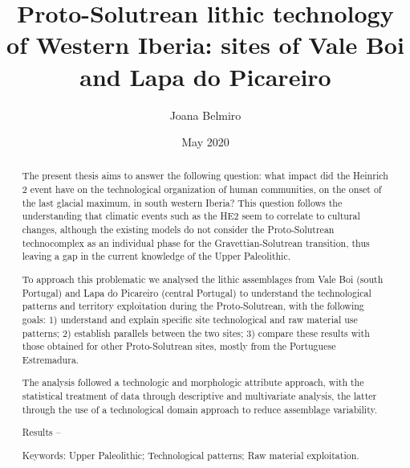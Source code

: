 \documentclass[12pt,twoside]{reedthesis}
\title{Proto-Solutrean lithic technology of Western Iberia: sites of Vale Boi and Lapa do Picareiro}
\author{Joana Belmiro}
\date{May 2020}
\begin{document}
  \maketitle

\frontmatter %
\pagestyle{empty} %


  \begin{abstract}
    The present thesis aims to answer the following question: what impact did the Heinrich 2 event have on the technological organization of human communities, on the onset of the last glacial maximum, in south western Iberia? This question follows the understanding that climatic events such as the HE2 seem to correlate to cultural changes, although the existing models do not consider the Proto-Solutrean technocomplex as an individual phase for the Gravettian-Solutrean transition, thus leaving a gap in the current knowledge of the Upper Paleolithic.
    
    \par
    
    To approach this problematic we analysed the lithic assemblages from Vale Boi (south Portugal) and Lapa do Picareiro (central Portugal) to understand the technological patterns and territory exploitation during the Proto-Solutrean, with the following goals: 1) understand and explain specific site technological and raw material use patterns; 2) establish parallels between the two sites; 3) compare these results with those obtained for other Proto-Solutrean sites, mostly from the Portuguese Estremadura.
    
    The analysis followed a technologic and morphologic attribute approach, with the statistical treatment of data through descriptive and multivariate analysis, the latter through the use of a technological domain approach to reduce assemblage variability.
    
    Results --
    
    Keywords: Upper Paleolithic; Technological patterns; Raw material exploitation.
  \end{abstract}
\end{document}
